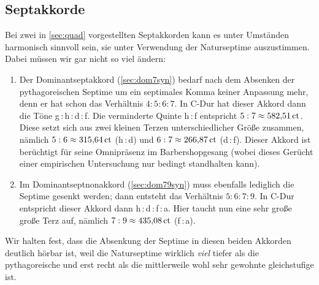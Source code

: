 \subsection{Septakkorde}

Bei zwei in \cref{sec:quad} vorgestellten Septakkorden kann es unter Umständen
harmonisch sinnvoll sein, sie unter Verwendung der Naturseptime auszustimmen.
Dabei müssen wir gar nicht so viel ändern:

\begin{enumerate}
\item Der Dominantseptakkord (\cref{sec:dom7syn}) bedarf nach dem Absenken der
  pythagoreischen Septime um ein septimales Komma keiner Anpassung mehr, denn er
  hat schon das Verhältnis $4:5:6:7$. In C-Dur hat dieser Akkord dann die Töne
  g\,:\,\naturalm h\,:\,d\,:\,\septimal f.  Die verminderte Quinte \naturalm
  h\,:\,\septimal f entspricht $5:7 \approx 582{,}51\,\text{ct}$.  Diese setzt sich aus
  zwei kleinen Terzen unterschiedlicher Größe zusammen, nämlich
  $5:6 \approx 315{,}64\,\text{ct}$ (\naturalm h\,:\,d) und $6:7\approx 266{,}87\,\text{ct}$
  (d\,:\,\septimal f).  Dieser Akkord ist berüchtigt für seine Omnipräsenz im
  Barbershopgesang (wobei dieses Gerücht einer empirischen Untersuchung
  \cite{Barbershop} nur bedingt standhalten kann).  
\item Im Dominantseptnonakkord (\cref{sec:dom79syn}) muss ebenfalls lediglich
  die Septime gesenkt werden; dann entsteht das Verhältnis $5:6:7:9$. In C-Dur
  entspricht dieser Akkord dann \naturalm h\,:\,d\,:\,\septimal f\,:\,a.  Hier
  taucht nun eine sehr große große Terz auf, nämlich $7:9\approx 435{,}08\,\text{ct}$
  (\septimal f\,:\,a).
\end{enumerate}
Wir halten fest, dass die Absenkung der Septime in diesen beiden Akkorden
deutlich hörbar ist, weil die Naturseptime wirklich \emph{viel} tiefer als die
pythagoreische und erst recht als die mittlerweile wohl sehr gewohnte
gleichstufige ist.

